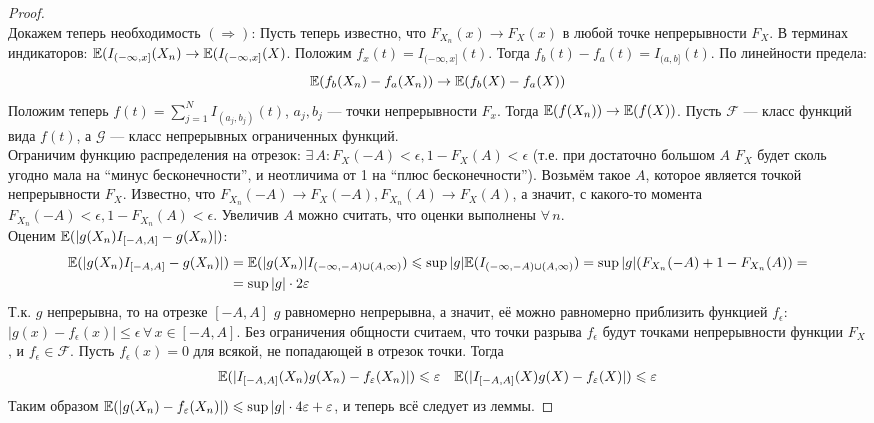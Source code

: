 \begin{proof}
\[    \]
    Докажем теперь необходимость $(\Rightarrow)$:
    Пусть теперь известно, что $F_{X_n}(x) \to F_X(x)$ в любой точке непрерывности $F_X$. В терминах индикаторов:
    $\mathbb{E}(I_{(-\infty, x]}(X_n) \to \mathbb{E}(I_{(-\infty, x]}(X)$. Положим $f_x(t) = I_{(-\infty, x]}(t)$.
    Тогда $f_b(t) - f_a(t) = I_{(a, b]}(t)$. По линейности предела:
    \[
        \mathbb{E}(f_b(X_n) - f_a(X_n)) \to \mathbb{E}(f_b(X) - f_a(X))
    \]
    Положим теперь $f(t) = \sum\limits_{j = 1}^N I_{(a_j, b_j)}(t)$, $a_j, b_j$ --- точки непрерывности $F_x$.
    Тогда $\mathbb{E}(f(X_n)) \to \mathbb{E}(f(X))$. Пусть $\mathcal{F}$ --- класс функций вида $f(t)$, а $\mathcal{G}$ ---
    класс непрерывных ограниченных функций.\\
    Ограничим функцию распределения на отрезок: $\exists\, A \colon F_X(-A) < \epsilon, 1 - F_X(A) < \epsilon$
    (т.е. при достаточно большом $A$ $F_X$ будет сколь угодно мала на ``минус бесконечности'', и
    неотличима от 1 на ``плюс бесконечности''). Возьмём такое $A$, которое является точкой непрерывности $F_X$.
    Известно, что $F_{X_n}(-A) \to F_X(-A), F_{X_n}(A) \to F_X(A)$, а значит, с какого-то момента
    $F_{X_n}(-A) < \epsilon, 1 - F_{X_n}(A) < \epsilon$. Увеличив $A$ можно считать, что оценки выполнены
    $\forall\,n$.\\
    Оценим $\mathbb{E}(|g(X_n)I_{[-A, A]} - g(X_n)|)$:
    \begin{align*}
        \mathbb{E}(|g(X_n)I_{[-A, A]} - g(X_n)|) &=
        \mathbb{E}(|g(X_n)|I_{(-\infty, -A) \cup (A, \infty)})
        \leqslant \mathop{\mathrm{sup}} |g| \mathbb{E}(I_{(-\infty, -A) \cup (A, \infty)}) =
        \mathop{\mathrm{sup}} |g|(F_{X_n}(-A) + 1 - F_{X_n}(A)) =\\
        &=\mathop{\mathrm{sup}} |g| \cdot 2 \varepsilon
    \end{align*}
    Т.к. $g$ непрерывна, то на отрезке $[-A, A]$ $g$ равномерно непрерывна, а значит, её можно равномерно приблизить
    функцией $f_{\epsilon}$: $|g(x) - f_{\epsilon}(x)| \leq \epsilon\, \forall\, x \in [-A, A]$. Без ограничения общности считаем,
    что точки разрыва $f_{\epsilon}$ будут точками непрерывности функции $F_X$, и $f_{\epsilon} \in \mathcal{F}$.
    Пусть $f_{\epsilon}(x) = 0$ для всякой, не попадающей в отрезок точки. Тогда
    \begin{align*}
        &\mathbb{E}(|I_{[-A, A]}(X_n)g(X_n) - f_{\varepsilon}(X_n)|) \leqslant \varepsilon
        &\mathbb{E}(|I_{[-A, A]}(X)g(X) - f_{\varepsilon}(X)|) \leqslant \varepsilon
    \end{align*}
    Таким образом $\mathbb{E}(|g(X_n) - f_{\varepsilon}(X_n)|) \leqslant \mathop{\mathrm{sup}} |g| \cdot 4\varepsilon + \varepsilon$, и
    теперь всё следует из леммы.
\end{proof}
